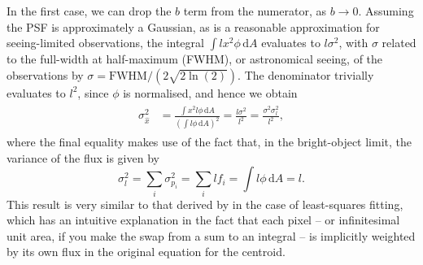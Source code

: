 \documentclass[SE,lsstdraft,authoryear,toc]{lsstdoc}
\begin{document}
In the first case, we can drop the $b$ term from the numerator, as $b \to 0$.
Assuming the PSF is approximately a Gaussian, as is a reasonable approximation for seeing-limited observations, the integral $\int\!l x^2 \phi\,\mathrm{d}A$ evaluates to $l \sigma^2$, with $\sigma$ related to the full-width at half-maximum (FWHM), or astronomical seeing, of the observations by $\sigma = \mathrm{FWHM} / (2 \sqrt{2 \ln(2)})$.
The denominator trivially evaluates to $l^2$, since $\phi$ is normalised, and hence we obtain
\begin{align}
\begin{split}
  \sigma_{\hat{x}}^2 &= \frac{\int\!x^2l\phi\,\mathrm{d}A}{\left(\int\!l\phi\,\mathrm{d}A\right)^2} = \frac{l \sigma^2}{l^2} = \frac{\sigma^2 \sigma_l^2}{l^2},
\end{split}
\end{align}
where the final equality makes use of the fact that, in the bright-object limit, the variance of the flux is given by
\begin{equation}
  \sigma_l^2 = \sum_i \sigma_{p_i}^2 = \sum_i l f_i = \int\! l \phi\,\mathrm{d}A = l.
\end{equation}
This result is very similar to that derived by \citet{King:1983aa} in the case of least-squares fitting, which has an intuitive explanation in the fact that each pixel -- or infinitesimal unit area, if you make the swap from a sum to an integral -- is implicitly weighted by its own flux in the original equation for the centroid.
\end{document}
